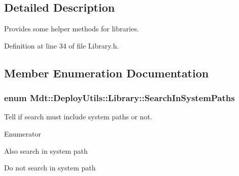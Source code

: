 \subsection{Detailed Description}
Provides some helper methods for libraries. 

Definition at line 34 of file Library.\+h.



\subsection{Member Enumeration Documentation}
\subsubsection[{\texorpdfstring{Search\+In\+System\+Paths}{SearchInSystemPaths}}]{\setlength{\rightskip}{0pt plus 5cm}enum {\bf Mdt\+::\+Deploy\+Utils\+::\+Library\+::\+Search\+In\+System\+Paths}}\hypertarget{class_mdt_1_1_deploy_utils_1_1_library_ab9f58dba8290dd1882a21d73cc7c10d0}{}\label{class_mdt_1_1_deploy_utils_1_1_library_ab9f58dba8290dd1882a21d73cc7c10d0}


Tell if search must include system paths or not. 

\begin{Desc}
\item[Enumerator]\par
\begin{description}
\item[{\em 
Include\+System\+Paths\hypertarget{class_mdt_1_1_deploy_utils_1_1_library_ab9f58dba8290dd1882a21d73cc7c10d0adabc8cd036aa884536c359cc3a2783ca}{}\label{class_mdt_1_1_deploy_utils_1_1_library_ab9f58dba8290dd1882a21d73cc7c10d0adabc8cd036aa884536c359cc3a2783ca}
}]Also search in system path \item[{\em 
Exclude\+System\+Paths\hypertarget{class_mdt_1_1_deploy_utils_1_1_library_ab9f58dba8290dd1882a21d73cc7c10d0ad00095fee49be0d8f0e8c7467dc8ebec}{}\label{class_mdt_1_1_deploy_utils_1_1_library_ab9f58dba8290dd1882a21d73cc7c10d0ad00095fee49be0d8f0e8c7467dc8ebec}
}]Do not search in system path \end{description}
\end{Desc}


